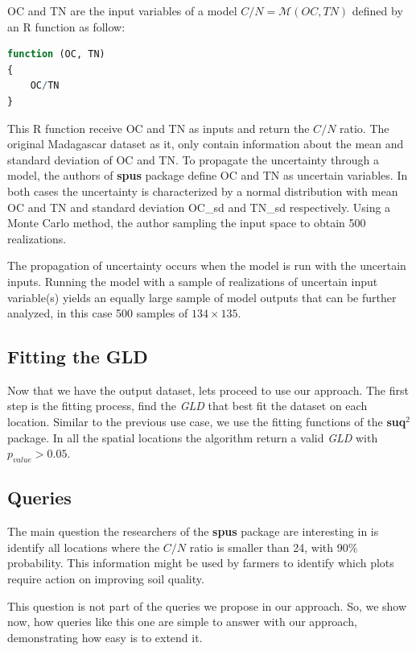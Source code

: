 OC and TN are the input variables of a model $C/N = \mathcal{M}(OC, TN)$ defined by an R function as follow:

\begin{lstlisting}[language=R]
function (OC, TN) 
{
    OC/TN
}
\end{lstlisting}

This R function receive OC and TN as inputs and return the $C/N$ ratio. The original Madagascar dataset as it, only contain information about the mean and standard deviation of OC and TN. To propagate the uncertainty through a model, the authors of \textbf{spus} package define OC and TN as uncertain variables. In both cases the uncertainty is characterized by a normal distribution with mean OC and TN and standard deviation OC\_sd and TN\_sd respectively. Using a Monte Carlo method, the author sampling the input space to obtain 500 realizations. 

The propagation of uncertainty occurs when the model is run with the uncertain inputs. Running the model with a sample of realizations of uncertain input variable(s) yields an equally large sample of model outputs that can be further analyzed, in this case 500 samples of $134 \times 135$.

\subsection{Fitting the GLD}
Now that we have the output dataset, lets proceed to use our approach. The first step is the fitting process, find the \textit{GLD} that best fit the dataset on each location. Similar to the previous use case, we use the fitting functions of the \textbf{suq$^2$} package. In all the spatial locations the algorithm return a valid \textit{GLD} with $p_{value} > 0.05$. 

\subsection{Queries}
The main question the researchers of the \textbf{spus} package are interesting in is identify all locations where the $C/N$ ratio is smaller than 24, with 90\% probability. This information might be used by farmers to identify which plots require action on improving soil quality.

This question is not part of the queries we propose in our approach. So, we show now, how queries like this one are simple to answer with our approach, demonstrating how easy is to extend it.

